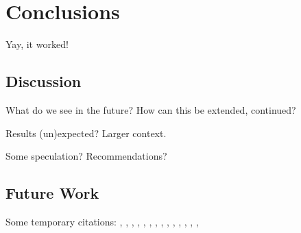 \documentclass[a4paper,11pt]{kth-mag}
\begin{document}

\pagestyle{newchap}
\chapter{Conclusions}
Yay, it worked!


\section{Discussion}

What do we see in the future? How can this be extended, continued?

Results (un)expected? Larger context.

Some speculation? Recommendations?

\section{Future Work}


Some temporary citations:
\cite{hoare69}, \cite{floyd67}, \cite{pnueli77}, \cite{leucker09abriefaccount},
\cite{bauer06monitoring}, \cite{bauer08goodbadugly}, \cite{delgado04taxonomy},
\cite{meyer92applyingdbc}, \cite{rosenblum95practicalassertions},
\cite{bartetzko01jass}, \cite{bodden04lightweightltl},
\cite{bodden05efficientrv}, \cite{becksmalltalktesting}, \cite{fowlerxunit},
\cite{matusiak09aoppy}












\end{document}
